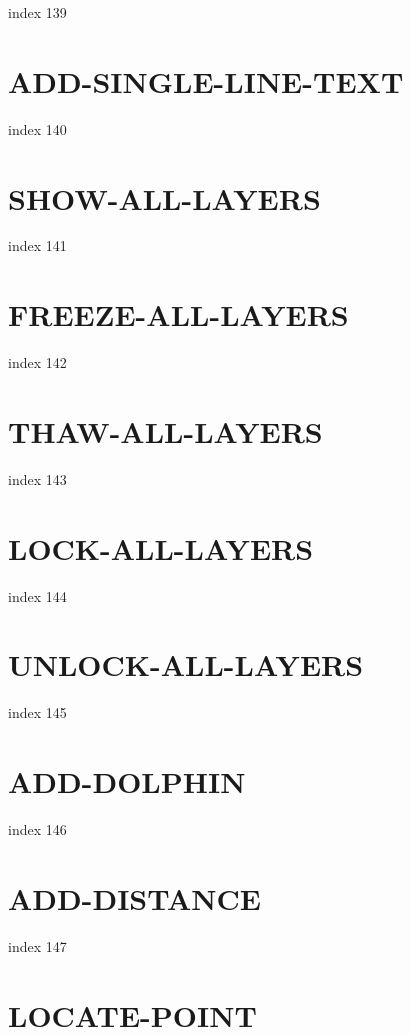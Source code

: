 \documentclass[10pt]{report}
\begin{document}
index 139

\section{ADD-SINGLE-LINE-TEXT}

index 140

\section{SHOW-ALL-LAYERS}

index 141

\section{FREEZE-ALL-LAYERS}

index 142

\section{THAW-ALL-LAYERS}

index 143

\section{LOCK-ALL-LAYERS}

index 144

\section{UNLOCK-ALL-LAYERS}

index 145

\section{ADD-DOLPHIN}

index 146

\section{ADD-DISTANCE}

index 147

\section{LOCATE-POINT}
\end{document}
